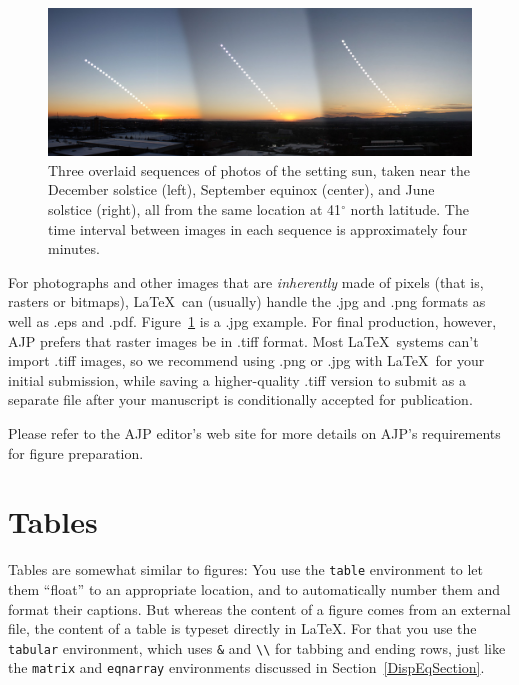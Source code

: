 \documentclass[prb,preprint]{revtex4-1}
\begin{document}
\begin{figure}[h!]
\centering
\includegraphics[width=5in]{ThreeSunsets.jpg}
\caption{Three overlaid sequences of photos of the setting sun, taken
near the December solstice (left), September equinox (center), and
June solstice (right), all from the same location at 41$^\circ$ north
latitude. The time interval between images in each sequence is approximately
four minutes.}
\label{sunsets}
\end{figure}

For photographs and other images that are \textit{inherently} made 
of pixels (that is, rasters or bitmaps), \LaTeX\ can 
(usually) handle the .jpg and .png formats as well as .eps and .pdf.  
Figure~\ref{sunsets} is a .jpg example. For final production, however, 
AJP prefers that raster images be in .tiff format.  Most \LaTeX\ systems 
can't import .tiff images, so we recommend using .png or .jpg with \LaTeX\ 
for your initial submission, while saving a higher-quality .tiff version 
to submit as a separate file after your manuscript is conditionally accepted
for publication.

Please refer to the AJP editor's web site\cite{editorsite} for more details 
on AJP's requirements for figure preparation.


\section{Tables}

Tables are somewhat similar to figures:  You use the \texttt{table} environment
to let them ``float'' to an appropriate location, and to automatically number
them and format their captions.  But whereas the content of a figure comes
from an external file, the content of a table is typeset directly in \LaTeX.
For that you use the \texttt{tabular} environment, which uses \verb/&/ and
\verb/\\/ for tabbing and ending rows, just like the \texttt{matrix} and
\texttt{eqnarray} environments discussed in Section~\ref{DispEqSection}.
\end{document}
